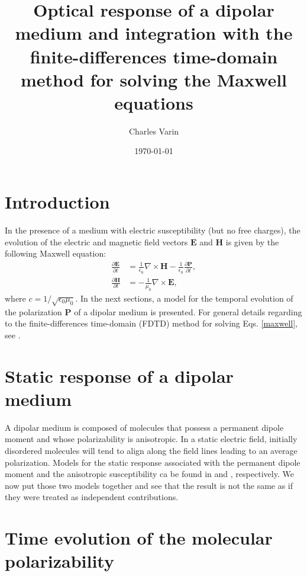 \documentclass[12pt,letterpaper]{article}
\date{\today}
\author{Charles Varin}
\title{Optical response of a dipolar medium and integration with the finite-differences time-domain method for solving the Maxwell equations}
\begin{document}
\maketitle 
\tableofcontents
\section{Introduction}\label{intro}
In the presence of a medium with electric susceptibility (but no free charges), the evolution of the electric and magnetic field vectors $\mathbf{E}$ and $\mathbf{H}$ is given by the following Maxwell equation:
\begin{subequations}\label{maxwell}
  \begin{align}\label{maxwell1}
   \frac{\partial\mathbf{E}}{\partial t} &=\frac{1}{\epsilon_0}\nabla\times\mathbf{H}-\frac{1}{\epsilon_0}\frac{\partial\mathbf{P}}{\partial t},\\
   \frac{\partial\mathbf{H}}{\partial t} &=-\frac{1}{\mu_0}\nabla\times\mathbf{E},\label{maxwell2}
  \end{align}
\end{subequations}
where $c = 1/\sqrt{\epsilon_0\mu_0}$. In the next sections, a model for the temporal evolution of the polarization $\mathbf{P}$ of a dipolar medium is presented. For general details regarding to the finite-differences time-domain (FDTD) method for solving Eqs. \ref{maxwell}, see \cite{sullivan2000,taflove2005}.

\section{Static response of a dipolar medium}\label{static}
A dipolar medium is composed of molecules that possess a permanent dipole moment and whose polarizability is anisotropic. In a static electric field, initially disordered molecules will tend to align along the field lines leading to an average polarization. Models for the static response associated with the permanent dipole moment and the anisotropic susceptibility ca be found in \cite{jackson1999,hook1991} and \cite{boyd2008}, respectively. We now put those two models together and see that the result is not the same as if they were treated as independent contributions. 



\section{Time evolution of the molecular polarizability}\label{time}

 

\end{document}
